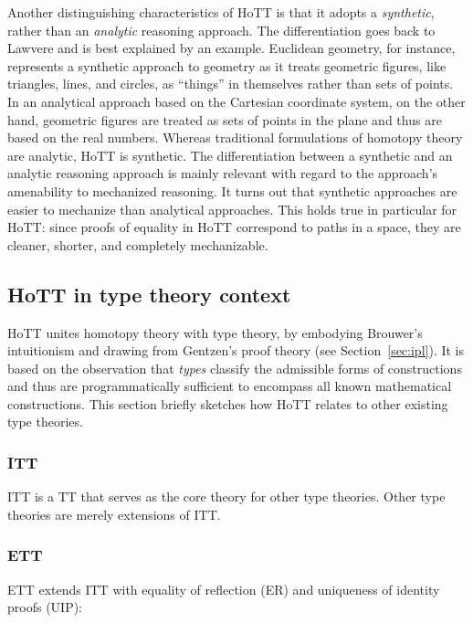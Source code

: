 \documentclass[12pt]{article}
\begin{document}
Another distinguishing characteristics of \acs{HoTT} is that it adopts a \emph{synthetic},
rather than an \emph{analytic} reasoning approach.  The differentiation goes back to Lawvere
and is best explained by an example.  Euclidean geometry, for instance, represents a synthetic
approach to geometry as it treats geometric figures, like triangles, lines, and circles, as
``things'' in themselves rather than sets of points.  In an analytical approach based on the
Cartesian coordinate system, on the other hand, geometric figures are treated as sets of points
in the plane and thus are based on the real numbers.  Whereas traditional formulations of
homotopy theory are analytic, \acs{HoTT} is synthetic.  The differentiation between a synthetic
and an analytic reasoning approach is mainly relevant with regard to the approach's amenability
to mechanized reasoning.  It turns out that synthetic approaches are easier to mechanize than
analytical approaches.  This holds true in particular for \acs{HoTT}: since proofs of equality
in \acs{HoTT} correspond to paths in a space, they are cleaner, shorter, and completely
mechanizable.

\subsection{\Acs{HoTT} in type theory context}\label{subsec:type_theory_context}

\Ac{HoTT} unites homotopy theory with type theory, by embodying Brouwer's intuitionism and
drawing from Gentzen's proof theory (see Section~\ref{sec:ipl}).  It is based on the
observation that \emph{types} classify the admissible forms of constructions and thus are
programmatically sufficient to encompass all known mathematical constructions.  This section
briefly sketches how \ac{HoTT} relates to other existing type theories.

\subsubsection{\Acl{ITT}}

\Acf{ITT} is a \acl{TT} that serves as the core theory for other type theories.  Other type theories
are merely extensions of \acs{ITT}.

\subsubsection{\Acl{ETT}}

\Acf{ETT} extends \acs{ITT} with equality of reflection (ER) and uniqueness of identity proofs (UIP):
\end{document}
